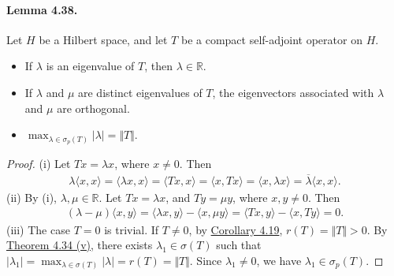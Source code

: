 \documentclass{article}
\begin{document}
\paragraph{Lemma 4.38.\label{lemma:4.38}} Let $H$ be a Hilbert space, and let $T$ be a compact self-adjoint operator on $H$.
\begin{itemize}
	\item[(i)] If $\lambda$ is an eigenvalue of $T$, then $\lambda\in\mathbb{R}$.
	\item[(ii)] If $\lambda$ and $\mu$ are distinct eigenvalues of $T$, the eigenvectors associated with $\lambda$ and $\mu$ are orthogonal.
	\item[(iii)] $\max_{\lambda\in\sigma_p(T)}\vert\lambda\vert = \Vert T\Vert$.
\end{itemize}
\begin{proof}
(i) Let $Tx=\lambda x$, where $x\neq 0$. Then
\begin{align*}
	\lambda\langle x,x\rangle = \langle \lambda x,x\rangle = \langle Tx,x\rangle = \langle x,Tx\rangle = \langle x,\lambda x\rangle = \overline{\lambda}\langle x,x\rangle.
\end{align*}
(ii) By (i), $\lambda,\mu\in\mathbb{R}$. Let $Tx=\lambda x$, and $Ty=\mu y$, where $x,y\neq 0$. Then
\begin{align*}
	(\lambda-\mu)\langle x,y\rangle = \langle \lambda x,y\rangle - \langle x,\mu y\rangle = \langle Tx,y\rangle - \langle x,Ty\rangle = 0.
\end{align*}
(iii) The case $T=0$ is trivial. If $T\neq 0$, by \hyperref[cor:4.19]{Corollary 4.19}, $r(T)=\Vert T\Vert> 0$. By \hyperref[thm:4.34]{Theorem 4.34 (v)}, there exists $\lambda_1\in\sigma(T)$ such that $\vert\lambda_1\vert = \max_{\lambda\in\sigma(T)}\vert\lambda\vert =r(T)=\Vert T\Vert$. Since $\lambda_1\neq 0$, we have $\lambda_1\in\sigma_p(T)$.
\end{proof}
\end{document}

